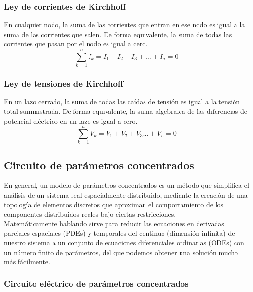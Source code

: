 \documentclass[]{article}
\begin{document}
\subsubsection{Ley de corrientes de Kirchhoff}

En cualquier nodo, la suma de las corrientes que entran en ese nodo es igual a la suma de las corrientes que salen. De forma equivalente, la suma de todas las corrientes que pasan por el nodo es igual a cero.\\

\begin{equation}
   \sum_{k=1}^n I_k = I_1 + I_2 + I_3+\dots + I_n = 0 
\end{equation}


\subsubsection{Ley de tensiones de Kirchhoff}

En un lazo cerrado, la suma de todas las caídas de tensión es igual a la tensión total suministrada. De forma equivalente, la suma algebraica de las diferencias de potencial eléctrico en un lazo es igual a cero.\cite{LeyesKirchhoff}\\

\begin{equation}
\sum_{k=1}^n V_k = V_1 + V_2 + V_3\dots + V_n = 0
\end{equation}

\subsection{Circuito de parámetros concentrados}

En general, un modelo de parámetros concentrados es un método que simplifica el análisis de un sistema real espacialmente distribuido, mediante la creación de una topología de elementos discretos que aproximan el comportamiento de los componentes distribuidos reales bajo ciertas restricciones.\\

Matemáticamente hablando sirve para reducir las ecuaciones en derivadas parciales espaciales (PDEs) y temporales del continuo (dimensión infinita) de nuestro sistema a un conjunto de ecuaciones diferenciales ordinarias (ODEs) con un número finito de parámetros, del que podemos obtener una solución mucho más fácilmente.\\

\subsubsection{Circuito eléctrico de parámetros concentrados} 
\end{document}
